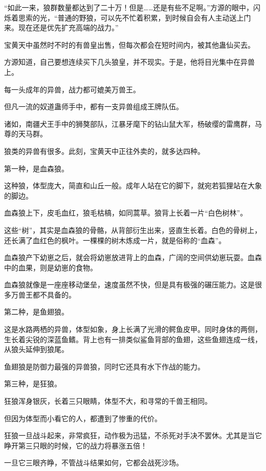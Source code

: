 
\begin{this_body}

“如此一来，狼群数量都达到了二十万！但是……还是有些不足啊。”方源的眼中，闪烁着思索的光，“普通的野狼，可以先不忙着积累，到时候自会有人主动送上门来。现在还是优先扩充高端的战力。”

宝黄天中虽然时不时的有兽皇出售，但每次都会在短时间内，被其他蛊仙买去。

方源知道，自己要想连续买下几头狼皇，并不现实。于是，他将目光集中在异兽上。

每一头成年的异兽，战力都可媲美万兽王。

但凡一流的奴道蛊师手中，都有一支异兽组成王牌队伍。

诸如，南疆犬王手中的狮獒部队，江暴牙麾下的钻山鼠大军，杨破缨的雷鹰群，马尊的天马群。

狼类的异兽有很多。此刻，宝黄天中正往外卖的，就多达四种。

第一种，是血森狼。

这种狼，体型庞大，简直和山丘一般。成年人站在它的脚下，就宛若狐狸站在大象的脚边。

血森狼上下，皮毛血红，狼毛枯槁，如同蒿草。狼背上长着一片“白色树林”。

这些“树”，其实是血森狼的骨骼，从背部衍生出来，竖直生长着。白色的骨树上，还长满了血红色的枫叶。一棵棵的树木炼成一片，就是俗称的“血森”。

血森狼产下幼崽之后，就会将幼崽放进背上的血森，广阔的空间供幼崽玩耍。血森中的血果，则是幼崽的食物。

血森狼就像是一座座移动堡垒，速度虽然不快，但是具有极强的碾压能力。这是很多万兽王都不具备的。

第二种，是鱼翅狼。

这是水路两栖的异兽，体型如象，身上长满了光滑的鳄鱼皮甲。同时身体的两侧，生长着尖锐的深蓝鱼鳍。背上也有一排类似鲨鱼背部的鱼翅，这些鱼翅连成一线，从狼头延伸到狼尾。

鱼翅狼是防御力最强的异兽狼，同时它还具有水下作战的能力。

第三种，是狂狼。

狂狼浑身银灰，长着三只眼睛，体型不大，和寻常的千兽王相同。

但因为体型而小看它的人，都遭到了惨重的代价。

狂狼一旦战斗起来，非常疯狂，动作极为迅猛，不杀死对手决不罢休。尤其是当它睁开第三只眼的时候，它的战力将暴涨五倍！

一旦它三眼齐睁，不管战斗结果如何，它都会战死沙场。


\end{this_body}
